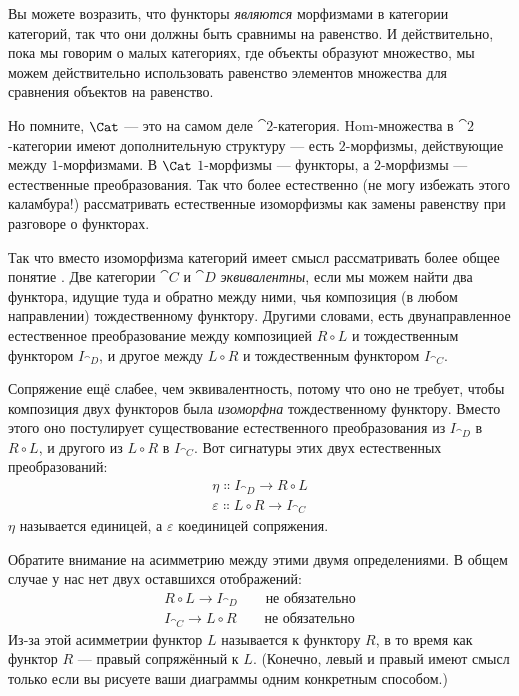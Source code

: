 Вы можете возразить, что функторы \emph{являются} морфизмами в категории
категорий, так что они должны быть сравнимы на равенство. И действительно, пока
мы говорим о малых категориях, где объекты образуют множество, мы
можем действительно использовать равенство элементов множества для сравнения
объектов на равенство.

Но помните, $\Cat$ --- это на самом деле $\cat{2}$-категория. Hom-множества в
$\cat{2}$-категории имеют дополнительную структуру --- есть $2$-морфизмы, действующие
между $1$-морфизмами. В $\Cat$ $1$-морфизмы --- функторы, а
$2$-морфизмы --- естественные преобразования. Так что более естественно (не могу
избежать этого каламбура!) рассматривать естественные изоморфизмы как замены
равенству при разговоре о функторах.

Так что вместо изоморфизма категорий имеет смысл рассматривать
более общее понятие . Две категории $\cat{C}$ и
$\cat{D}$ \emph{эквивалентны}, если мы можем найти два функтора, идущие туда и
обратно между ними, чья композиция (в любом направлении)
 тождественному функтору. Другими словами,
есть двунаправленное естественное преобразование между композицией
$R \circ L$ и тождественным функтором $I_{\cat{D}}$, и другое
между $L \circ R$ и тождественным функтором $I_{\cat{C}}$.

Сопряжение ещё слабее, чем эквивалентность, потому что оно не требует,
чтобы композиция двух функторов была \emph{изоморфна}
тождественному функтору. Вместо этого оно постулирует существование 
естественного преобразования из $I_{\cat{D}}$ в $R \circ L$, и
другого из $L \circ R$ в $I_{\cat{C}}$. Вот сигнатуры
этих двух естественных преобразований:
\begin{gather*}
  \eta \Colon I_{\cat{D}} \to R \circ L \\
  \varepsilon \Colon L \circ R \to I_{\cat{C}}
\end{gather*}
$\eta$ называется единицей, а $\varepsilon$ коединицей сопряжения.

Обратите внимание на асимметрию между этими двумя определениями. В общем случае у нас нет
двух оставшихся отображений:
\begin{gather*}
  R \circ L \to I_{\cat{D}} \quad\quad\text{не обязательно} \\
  I_{\cat{C}} \to L \circ R \quad\quad\text{не обязательно}
\end{gather*}
Из-за этой асимметрии функтор $L$ называется
 к функтору $R$, в то время как функтор
$R$ --- правый сопряжённый к $L$. (Конечно, левый и
правый имеют смысл только если вы рисуете ваши диаграммы одним конкретным способом.)

